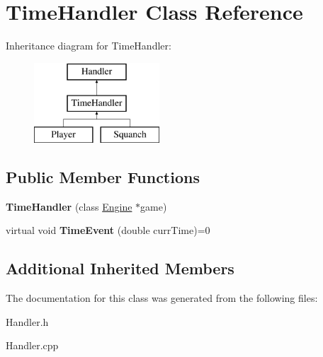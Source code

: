 \hypertarget{class_time_handler}{}\section{Time\+Handler Class Reference}
\label{class_time_handler}
Inheritance diagram for Time\+Handler\+:\begin{figure}[H]
\begin{center}
\leavevmode
\includegraphics[height=3.000000cm]{class_time_handler}
\end{center}
\end{figure}
\subsection*{Public Member Functions}
\begin{DoxyCompactItemize}
\item 
\hypertarget{class_time_handler_a606ca4ea15838eeed25b77be8c819cf1}{}\label{class_time_handler_a606ca4ea15838eeed25b77be8c819cf1} 
{\bfseries Time\+Handler} (class \hyperlink{class_engine}{Engine} $\ast$game)
\item 
\hypertarget{class_time_handler_aa403cac55724be7af8b790088d40b29c}{}\label{class_time_handler_aa403cac55724be7af8b790088d40b29c} 
virtual void {\bfseries Time\+Event} (double curr\+Time)=0
\end{DoxyCompactItemize}
\subsection*{Additional Inherited Members}


The documentation for this class was generated from the following files\+:\begin{DoxyCompactItemize}
\item 
Handler.\+h\item 
Handler.\+cpp\end{DoxyCompactItemize}
